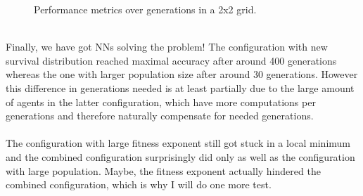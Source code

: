 \documentclass[11pt]{report}
\begin{document}
\begin{enumerate}
\begin{figure}[H]
\begin{adjustbox}{valign=c,margin=-2cm 0pt 0pt 0pt}
\begin{minipage}{1.1\textwidth}
\begin{subfigure}[b]{0.45\textwidth}
                \end{subfigure}


            \end{minipage}
        \end{adjustbox}
        \caption{Performance metrics over generations in a 2x2 grid.}
        \label{fig:performances-3}


    \end{figure}
    \\
    Finally, we have got NNs solving the problem!
    The configuration with new survival distribution reached maximal accuracy after around 400 generations whereas the one with larger population size after around 30 generations.
    However this difference in generations needed is at least partially due to the large amount of agents in the latter configuration, which have more computations per generations and therefore naturally compensate for needed generations.
    \\ \\
    The configuration with large fitness exponent still got stuck in a local minimum and the combined configuration surprisingly did only as well as the configuration with large population.
    Maybe, the fitness exponent actually hindered the combined configuration, which is why I will do one more test.

\end{enumerate}
\end{document}

